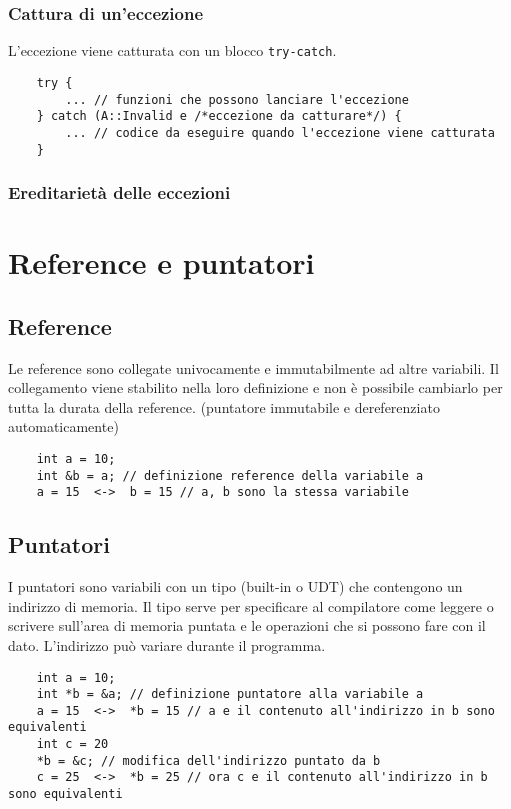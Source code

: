 \documentclass[a4paper]{article}
\begin{document}
\subsubsection*{Cattura di un'eccezione}
L'eccezione viene catturata con un blocco \verb|try-catch|.
\begin{lstlisting}
	try {
		... // funzioni che possono lanciare l'eccezione
	} catch (A::Invalid e /*eccezione da catturare*/) {
		... // codice da eseguire quando l'eccezione viene catturata
	}
\end{lstlisting}

\subsubsection*{Ereditarietà delle eccezioni}

\newpage

\section{Reference e puntatori}
\subsection{Reference}
Le reference sono  collegate univocamente e immutabilmente ad altre variabili. Il collegamento viene stabilito
nella loro definizione e non è possibile cambiarlo per tutta la durata della reference. (puntatore immutabile e dereferenziato
automaticamente)
\begin{lstlisting}
	int a = 10;
	int &b = a; // definizione reference della variabile a
	a = 15  <->  b = 15 // a, b sono la stessa variabile
\end{lstlisting}

\subsection{Puntatori}
I puntatori sono variabili con un tipo (built-in o UDT) che contengono un indirizzo di memoria. Il tipo serve per specificare al
compilatore come leggere o scrivere sull'area di memoria puntata e le operazioni che si possono fare con il dato. L'indirizzo
può variare durante il programma.
\begin{lstlisting}
	int a = 10;
	int *b = &a; // definizione puntatore alla variabile a
	a = 15  <->  *b = 15 // a e il contenuto all'indirizzo in b sono equivalenti
	int c = 20
	*b = &c; // modifica dell'indirizzo puntato da b
	c = 25  <->  *b = 25 // ora c e il contenuto all'indirizzo in b sono equivalenti
\end{lstlisting}
\end{document}
